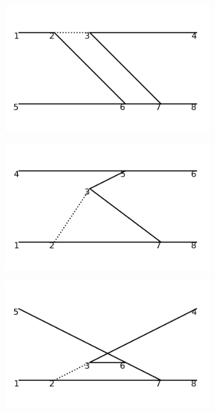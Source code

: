 \documentclass[11pt,a4paper,twoside,pdf]{article}
\numberwithin{equation}{section}
\begin{document}
\begin{figure}[h!]
\begin{subfigure}[t]{0.16\textwidth}
    \end{subfigure}
    \hfill
    \begin{subfigure}[t]{0.16\textwidth}
        \centering
        \includegraphics[width=\textwidth]{plots/order4_2to2/13.png}
    \end{subfigure}
    \hfill
    \begin{subfigure}[t]{0.16\textwidth}
        \centering
        \includegraphics[width=\textwidth]{plots/order4_2to2/14.png}
    \end{subfigure}
    \hfill
    \begin{subfigure}[t]{0.16\textwidth}
        \centering
        \includegraphics[width=\textwidth]{plots/order4_2to2/15.png}

\end{subfigure}
\end{figure}
\end{document}
